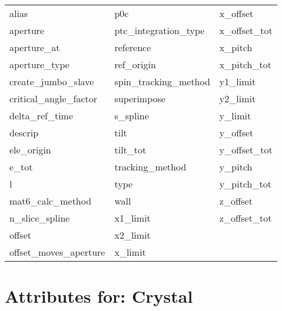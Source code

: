  \begin{tabular}{lll} \toprule
alias                       & p0c                         & x_offset                    \\
aperture                    & ptc_integration_type        & x_offset_tot                \\
aperture_at                 & reference                   & x_pitch                     \\
aperture_type               & ref_origin                  & x_pitch_tot                 \\
create_jumbo_slave          & spin_tracking_method        & y1_limit                    \\
critical_angle_factor       & superimpose                 & y2_limit                    \\
delta_ref_time              & s_spline                    & y_limit                     \\
descrip                     & tilt                        & y_offset                    \\
ele_origin                  & tilt_tot                    & y_offset_tot                \\
e_tot                       & tracking_method             & y_pitch                     \\
l                           & type                        & y_pitch_tot                 \\
mat6_calc_method            & wall                        & z_offset                    \\
n_slice_spline              & x1_limit                    & z_offset_tot                \\
offset                      & x2_limit                    &                             \\
offset_moves_aperture       & x_limit                     &                             \\
 \bottomrule
 \end{tabular}
 \vfill
 
 \section{Attributes for: Crystal}
 \label{s:list.crystal}
 
